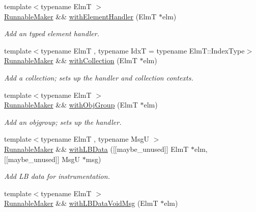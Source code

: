 \begin{DoxyCompactItemize}
{\footnotesize template$<$typename ElmT $>$ }\\\hyperlink{structvt_1_1runnable_1_1_runnable_maker}{Runnable\+Maker} \&\& \hyperlink{structvt_1_1runnable_1_1_runnable_maker_a1b37afe7a5ab185c29e85e0d6ebbbc82}{with\+Element\+Handler} (ElmT $\ast$elm)
\begin{DoxyCompactList}\small\item\em Add an typed element handler. \end{DoxyCompactList}\item 
{\footnotesize template$<$typename ElmT , typename IdxT  = typename Elm\+T\+::\+Index\+Type$>$ }\\\hyperlink{structvt_1_1runnable_1_1_runnable_maker}{Runnable\+Maker} \&\& \hyperlink{structvt_1_1runnable_1_1_runnable_maker_aed99a9b0607da59ab7ad7ee56255fcc8}{with\+Collection} (ElmT $\ast$elm)
\begin{DoxyCompactList}\small\item\em Add a collection; sets up the handler and collection contexts. \end{DoxyCompactList}\item 
{\footnotesize template$<$typename ElmT $>$ }\\\hyperlink{structvt_1_1runnable_1_1_runnable_maker}{Runnable\+Maker} \&\& \hyperlink{structvt_1_1runnable_1_1_runnable_maker_acc0749541ac045169d28e5748dc7d1ed}{with\+Obj\+Group} (ElmT $\ast$elm)
\begin{DoxyCompactList}\small\item\em Add an objgroup; sets up the handler. \end{DoxyCompactList}\item 
{\footnotesize template$<$typename ElmT , typename MsgU $>$ }\\\hyperlink{structvt_1_1runnable_1_1_runnable_maker}{Runnable\+Maker} \&\& \hyperlink{structvt_1_1runnable_1_1_runnable_maker_a64264db5615ea10efe02dbd1d8ec92ea}{with\+L\+B\+Data} (\mbox{[}\mbox{[}maybe\+\_\+unused\mbox{]}\mbox{]} ElmT $\ast$elm, \mbox{[}\mbox{[}maybe\+\_\+unused\mbox{]}\mbox{]} MsgU $\ast$msg)
\begin{DoxyCompactList}\small\item\em Add LB data for instrumentation. \end{DoxyCompactList}\item 
{\footnotesize template$<$typename ElmT $>$ }\\\hyperlink{structvt_1_1runnable_1_1_runnable_maker}{Runnable\+Maker} \&\& \hyperlink{structvt_1_1runnable_1_1_runnable_maker_a42a6e2d7b273b6bb61d6659c2651d3c5}{with\+L\+B\+Data\+Void\+Msg} (ElmT $\ast$elm)

\end{DoxyCompactItemize}
